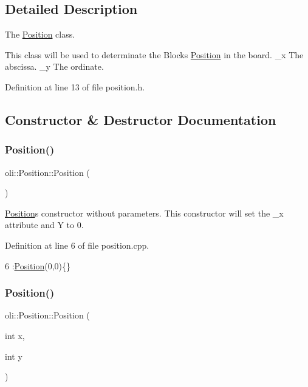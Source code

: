 \subsection{Detailed Description}
The \hyperlink{classoli_1_1_position}{Position} class. 

This class will be used to determinate the Block\textquotesingle{}s \hyperlink{classoli_1_1_position}{Position} in the board. \+\_\+x The abscissa. \+\_\+y The ordinate. 

Definition at line 13 of file position.\+h.



\subsection{Constructor \& Destructor Documentation}
\hypertarget{classoli_1_1_position_ade4913282bb68eb3d5a95dd504ad374c}{}\label{classoli_1_1_position_ade4913282bb68eb3d5a95dd504ad374c} 
\subsubsection{\texorpdfstring{Position()}{Position()}\hspace{0.1cm}{\footnotesize\ttfamily [1/2]}}
{\footnotesize\ttfamily oli\+::\+Position\+::\+Position (\begin{DoxyParamCaption}{ }\end{DoxyParamCaption})}



\hyperlink{classoli_1_1_position}{Position}\textquotesingle{}s constructor without parameters. This constructor will set the \+\_\+x attribute and Y to 0. 



Definition at line 6 of file position.\+cpp.


\begin{DoxyCode}
6 :\hyperlink{classoli_1_1_position_ade4913282bb68eb3d5a95dd504ad374c}{Position}(0,0)\{\}
\end{DoxyCode}
\hypertarget{classoli_1_1_position_afcbdd002ad9be728dbfe4daecd745621}{}\label{classoli_1_1_position_afcbdd002ad9be728dbfe4daecd745621} 
\subsubsection{\texorpdfstring{Position()}{Position()}\hspace{0.1cm}{\footnotesize\ttfamily [2/2]}}
{\footnotesize\ttfamily oli\+::\+Position\+::\+Position (\begin{DoxyParamCaption}\item[{int}]{x,  }\item[{int}]{y }\end{DoxyParamCaption})}



